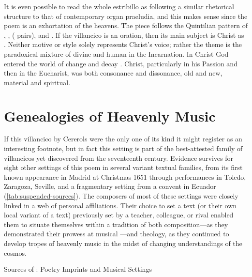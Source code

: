 It is even possible to read the whole estribillo as following a similar
rhetorical structure to that of contemporary organ praeludia, and this makes
sense since the poem is an exhortation of the heavens.%
The piece follows the Quintilian pattern of , ,
 ( pairs), and .
If the villancico is an oration, then its main subject is Christ as .
Neither motive or style solely represents Christ's voice; rather the theme is
the paradoxical mixture of divine and human in the Incarnation.
In Christ God entered the world of change and decay .
Christ, particularly in his Passion and then in the Eucharist, was both
consonance and dissonance, old and new, material and spiritual.

\section{Genealogies of Heavenly Music}

If this villancico by Cererols were the only one of its kind it might register
as an interesting footnote, but in fact this setting is part of the
best-attested family of villancicos yet discovered from the seventeenth century.
Evidence survives for eight other settings of this poem in several variant
textual families, from its first known appearance in Madrid at Christmas 1651
through performances in Toledo, Zaragoza, Seville, and a fragmentary setting
from a convent in Ecuador (\cref{tab:suspended-sources}).
The composers of most of these settings were closely linked in a web of personal
affiliations.
Their choice to set a text (or their own local variant of a text) previously set
by a teacher, colleague, or rival enabled them to situate themselves within a
tradition of both composition---as they demonstrated their prowess at musical
---and theology, as they continued to develop tropes of
heavenly music in the midst of changing understandings of the cosmos.

{Sources of : Poetry Imprints and
Musical Settings}

